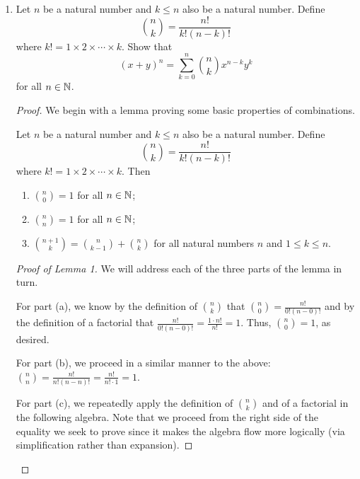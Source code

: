 \documentclass[../main.tex]{subfiles}
\begin{document}
\begin{enumerate}[ref={\thechapter.\arabic*}]
    \item \label{axr:0.7}Let $n$ be a natural number and $k\leq n$ also be a natural number. Define
    \begin{equation*}
        \binom{n}{k} = \frac{n!}{k!(n-k)!}
    \end{equation*}
    where $k!=1\times 2\times\cdots\times k$. Show that
    \begin{equation*}
        (x+y)^n = \sum_{k=0}^n\binom{n}{k}x^{n-k}y^k
    \end{equation*}
    for all $n\in\mathbb{N}$.\par
    \begin{proof}
        We begin with a lemma proving some basic properties of combinations.
        \setcounter{theorem}{0}
        \begin{lemma*}
            Let $n$ be a natural number and $k\leq n$ also be a natural number. Define
            \begin{equation*}
                \binom{n}{k} = \frac{n!}{k!(n-k)!}
            \end{equation*}
            where $k!=1\times 2\times\cdots\times k$. Then
            \begin{enumerate}[label={\alph*\textup{)}}]
                \item $\binom{n}{0}=1$ for all $n\in\mathbb{N}$;
                \item $\binom{n}{n}=1$ for all $n\in\mathbb{N}$;
                \item $\binom{n+1}{k}=\binom{n}{k-1}+\binom{n}{k}$ for all natural numbers $n$ and $1\leq k\leq n$.
            \end{enumerate}
            \begin{proof}[Proof of Lemma 1]
                We will address each of the three parts of the lemma in turn.\par
                For part (a), we know by the definition of $\binom{n}{k}$ that $\binom{n}{0}=\frac{n!}{0!(n-0)!}$ and by the definition of a factorial that $\frac{n!}{0!(n-0)!}=\frac{1\cdot n!}{n!}=1$. Thus, $\binom{n}{0}=1$, as desired.\par
                For part (b), we proceed in a similar manner to the above: $\binom{n}{n}=\frac{n!}{n!(n-n)!}=\frac{n!}{n!\cdot 1}=1$.\par
                For part (c), we repeatedly apply the definition of $\binom{n}{k}$ and of a factorial in the following algebra. Note that we proceed from the right side of the equality we seek to prove since it makes the algebra flow more logically (via simplification rather than expansion).

\end{proof}
\end{lemma*}
\end{proof}
\end{enumerate}
\end{document}

